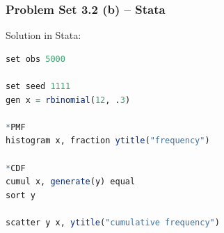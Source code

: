 \documentclass[xcolor=table]{beamer}
\begin{document}

\begin{frame}[fragile]
\frametitle{Problem Set 3.2 (b) -- Stata}
Solution in Stata:
\begin{lstlisting}[language = R]
set obs 5000

set seed 1111
gen x = rbinomial(12, .3)

*PMF
histogram x, fraction ytitle("frequency")

*CDF
cumul x, generate(y) equal
sort y

scatter y x, ytitle("cumulative frequency")

\end{lstlisting}
\end{frame}

\end{document}
